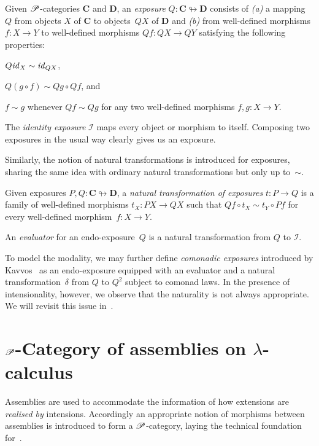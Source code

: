 \documentclass[draft,a4paper,UKenglish,numberwithinsect,cleveref,thm-restate]{lipics-v2021}
\numberwithin{equation}{section}
\theoremstyle{definition}
\theoremstyle{plain}
\begin{document}
\begin{definition}
  Given $\mathscr{P}$-categories $\mathbf{C}$ and $\mathbf{D}$, an \emph{exposure} $Q\colon \mathbf{C} \looparrowright \mathbf{D}$ consists of \emph{(a)} a mapping $Q$ from objects $X$ of\/ $\mathbf{C}$ to objects~$QX$ of\/ $\mathbf{D}$ and \emph{(b)} from well-defined morphisms $f\colon X \to Y$ to well-defined morphisms $Qf\colon QX \to QY$ satisfying the following properties:
  \begin{romanenumerate}
    \item $Q\mathit{id}_X \sim \mathit{id}_{QX}$,
    \item $Q(g \circ f) \sim Qg \circ Qf$, and
    \item $f \sim g$ whenever $Qf \sim Qg$ for any two well-defined morphisms $f, g\colon X \to Y$. 
  \end{romanenumerate}
\end{definition}
The \emph{identity exposure} $\mathcal{I}$ maps every object or morphism to itself.
Composing two exposures in the usual way clearly gives us an exposure. 

Similarly, the notion of natural transformations is introduced for exposures, sharing the same idea with ordinary natural transformations but only up to~$\sim$.
\begin{definition}
  Given exposures $P, Q\colon \mathbf{C} \looparrowright \mathbf{D}$, a \emph{natural transformation of exposures} $t\colon P \to Q$ is a family of well-defined morphisms $t_X \colon PX \to QX$ such that $Qf \circ t_X \sim t_Y \circ Pf$ for every well-defined morphism~$f\colon X \to Y$. 
\end{definition}
An \emph{evaluator} for an endo-exposure~$Q$ is a natural transformation from $Q$ to $\mathcal{I}$.

To model the \SFour modality, we may further define \emph{comonadic exposures} introduced by Kavvos~\cite{Kavvos2017b} as an endo-exposure equipped with an evaluator and a natural transformation~$\delta$ from $Q$ to $Q^2$ subject to comonad laws.
In the presence of intensionality, however, we observe that the naturality is not always appropriate.
We will revisit this issue in~.

\section{\texorpdfstring{$\mathscr{P}$}{P}-Category of assemblies on \texorpdfstring{$\lambda$}{λ}-calculus}\label{sec:assemblies}

Assemblies are used to accommodate the information of how extensions are \emph{realised by} intensions.
Accordingly an appropriate notion of morphisms between assemblies is introduced to form a $\mathscr{P}$-category, laying
the technical foundation for~.
\end{document}
